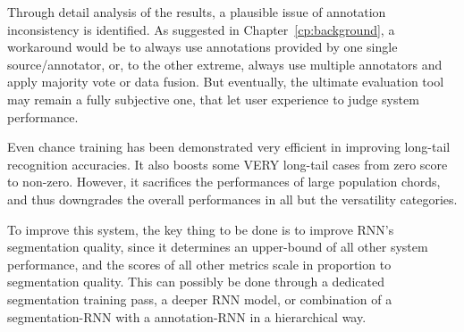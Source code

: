 Through detail analysis of the results, a plausible issue of annotation inconsistency is identified. As suggested in Chapter~\ref{cp:background}, a workaround would be to always use annotations provided by one single source/annotator, or, to the other extreme, always use multiple annotators and apply majority vote or data fusion. But eventually, the ultimate evaluation tool may remain a fully subjective one, that let user experience to judge system performance.

Even chance training has been demonstrated very efficient in improving long-tail recognition accuracies. It also boosts some VERY long-tail cases from zero score to non-zero. However, it sacrifices the performances of large population chords, and thus downgrades the overall performances in all but the versatility categories.

To improve this system, the key thing to be done is to improve RNN's segmentation quality, since it determines an upper-bound of all other system performance, and the scores of all other metrics scale in proportion to segmentation quality. This can possibly be done through a dedicated segmentation training pass, a deeper RNN model, or combination of a segmentation-RNN with a annotation-RNN in a hierarchical way.





